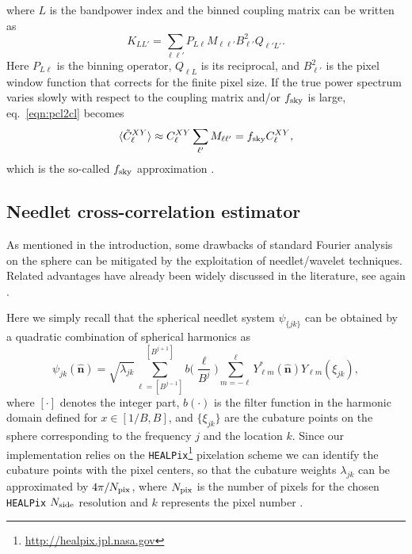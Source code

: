 \documentclass[a4paper,11pt]{article}
\newcommand{\nver}{\hat{\mathbf{n}}}
\begin{document}
%
where $L$ is the bandpower index and the binned coupling matrix can be written as
%
\begin{equation}
K_{LL'} = \sum_{\ell\ell'} P_{L\ell}M_{\ell\ell'}B^2_{\ell'}Q_{\ell' L'}.
\end{equation}
%
Here $P_{L\ell}$ is the binning operator, $Q_{\ell L}$ is its reciprocal, and $B^2_{\ell'}$ is the pixel window function that corrects for the finite pixel size. If the true power spectrum varies slowly with respect to the coupling matrix and/or $f_{\rm sky}$ is large, eq.~\ref{eqn:pcl2cl} becomes  
%
\begin{equation}
\label{eqn:fsky_app}
\langle \tilde{C}^{XY}_{\ell}\rangle \approx  C^{XY}_{\ell}  \sum_{\ell'} M_{\ell\ell'} = f_{\rm sky} C^{XY}_{\ell},
\end{equation}
%
which is the so-called $f_{\rm sky}$ approximation \citep{Komatsu2002a}.

\subsection{Needlet cross-correlation estimator}
\label{subsec:needcorr}
As mentioned in the introduction, some drawbacks of standard Fourier analysis on the sphere can be mitigated by the exploitation of needlet/wavelet techniques. Related advantages have already been widely discussed in the literature, see again \cite{Marinucci2007,Lan2008,Donzelli2012,Troja2014,Marinucci2011,Durastanti2014}.

Here we simply recall that the spherical needlet system $\psi_{\{jk\}}$ can be obtained by a quadratic combination of spherical harmonics as
%
\begin{equation}
\label{eqn:needfunc}
\psi_{jk}(\nver) = \sqrt{\lambda_{jk}} \sum_{\ell=[B^{j-1}]}^{[B^{j+1}]} b\biggl(\frac{\ell}{B^{j}}\biggr)\sum_{m=-\ell}^{\ell}Y^*_{\ell m}(\nver)Y_{\ell m}(\xi_{jk}),
\end{equation}
%
where $[\cdot]$ denotes the integer part, $b(\cdot)$ is the filter function in the harmonic domain defined for $x\in [1/B,B]$, and $\{\xi_{jk}\}$ are the cubature points on the sphere corresponding to the frequency $j$ and the location $k$. Since our implementation relies on the \texttt{HEALPix}\footnote{\url{http://healpix.jpl.nasa.gov}} \cite{Gorski2005}
 pixelation scheme we can identify the cubature points with the pixel centers, so that the cubature weights $\lambda_{jk}$ can be approximated by $4\pi/N_{\rm pix}$, where $N_{\rm pix}$ is the number of pixels for the chosen \texttt{HEALPix} $N_{\rm side}$ resolution and $k$ represents the pixel number \cite{Pietrobon2006}. 
 
\end{document}
